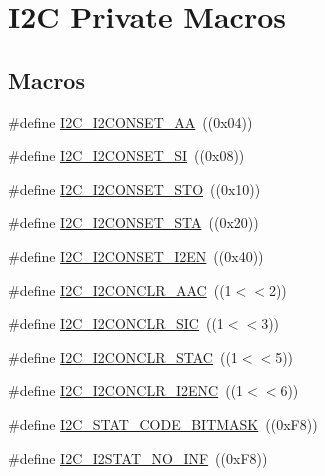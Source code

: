 \hypertarget{group___i2_c___private___macros}{}\section{I2C Private Macros}
\label{group___i2_c___private___macros}
\subsection*{Macros}
\begin{DoxyCompactItemize}
\item 
\#define \hyperlink{group___i2_c___private___macros_ga784c4b2fe7f3299e338655d2ddbf283c}{I2\+C\+\_\+\+I2\+C\+O\+N\+S\+E\+T\+\_\+\+AA}~((0x04))
\item 
\#define \hyperlink{group___i2_c___private___macros_gaa447cd2686805ef8009fc599144ee3dc}{I2\+C\+\_\+\+I2\+C\+O\+N\+S\+E\+T\+\_\+\+SI}~((0x08))
\item 
\#define \hyperlink{group___i2_c___private___macros_gaae292803a059b84eac20ab8777d113af}{I2\+C\+\_\+\+I2\+C\+O\+N\+S\+E\+T\+\_\+\+S\+TO}~((0x10))
\item 
\#define \hyperlink{group___i2_c___private___macros_gabaad3370eb35644c135d40f06adbbba0}{I2\+C\+\_\+\+I2\+C\+O\+N\+S\+E\+T\+\_\+\+S\+TA}~((0x20))
\item 
\#define \hyperlink{group___i2_c___private___macros_gab836acc31e0572bb0d0db614f0641f15}{I2\+C\+\_\+\+I2\+C\+O\+N\+S\+E\+T\+\_\+\+I2\+EN}~((0x40))
\item 
\#define \hyperlink{group___i2_c___private___macros_gaa13b19babb8442aa9047f8ecb92a908d}{I2\+C\+\_\+\+I2\+C\+O\+N\+C\+L\+R\+\_\+\+A\+AC}~((1$<$$<$2))
\item 
\#define \hyperlink{group___i2_c___private___macros_ga36753112210a8c33d566b572b63b753b}{I2\+C\+\_\+\+I2\+C\+O\+N\+C\+L\+R\+\_\+\+S\+IC}~((1$<$$<$3))
\item 
\#define \hyperlink{group___i2_c___private___macros_gab6148bf41d7fc32bd259d2f6a7d7667d}{I2\+C\+\_\+\+I2\+C\+O\+N\+C\+L\+R\+\_\+\+S\+T\+AC}~((1$<$$<$5))
\item 
\#define \hyperlink{group___i2_c___private___macros_ga92718ac11d46f6e32d526749f09d01b2}{I2\+C\+\_\+\+I2\+C\+O\+N\+C\+L\+R\+\_\+\+I2\+E\+NC}~((1$<$$<$6))
\item 
\#define \hyperlink{group___i2_c___private___macros_gafeb8b5f682a81a2cc32f6c4b720a5e1f}{I2\+C\+\_\+\+S\+T\+A\+T\+\_\+\+C\+O\+D\+E\+\_\+\+B\+I\+T\+M\+A\+SK}~((0x\+F8))
\item 
\#define \hyperlink{group___i2_c___private___macros_ga3e2ecdeb466041bb3cf435ccf36564d9}{I2\+C\+\_\+\+I2\+S\+T\+A\+T\+\_\+\+N\+O\+\_\+\+I\+NF}~((0x\+F8))

\end{DoxyCompactItemize}
